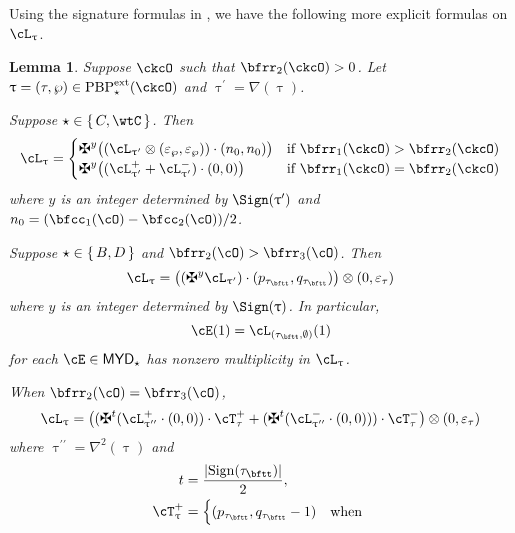 \documentclass[12pt,a4paper]{amsart}
\def\abs#1{\left|{#1}\right|}
\def\MYD{{\mathsf{MYD}}}
\def\pac#1{\ac_{#1}^+}
\def\nac#1{\ac_{#1}^-}
\def\ac{\cL}
\def\lotimes{\otimes}
\def\DD{\nabla}
\numberwithin{equation}{section}
\newtheorem{lem}[thm]{Lemma}
\theoremstyle{remark}
\def\ssign{\mathrm{Sign}}
\def\PBPes{\mathrm{PBP}^{\mathrm{ext}}_{\star}}
\def\pcT{\cT^+}
\def\ncT{\cT^-}
\def\uptaup{\uptau^{\prime}}
\def\uptaupp{\uptau^{\prime\prime}}
\begin{document}
Using the signature formulas in , we have the following more
explicit formulas on $\ac_{\uptau}$.
\begin{lem}\label{lem:dlift}
  Suppose $\ckcO$ such that $\bfrr_{2}(\ckcO)>0$. Let
  $\uptau = (\tau,\wp)\in \PBPes(\ckcO)$ and $\uptaup = \DD(\uptau)$.
\begin{enuma}
  \item
  Suppose $\star\in \set{C,\wtC}$.  Then
  \begin{equation}\label{eq:C}
    \ac_{\uptau}=
    \begin{cases}
      \maltese^{y}\big( (\ac_{\uptau'}\lotimes (\varepsilon_{\wp},\varepsilon_{\wp}))
      \cdot (n_{0},n_{0})\big) & \text{if } \bfrr_{1}(\ckcO)>\bfrr_{2}(\ckcO)\\
      \maltese^{y}\big( (\pac{\uptau'} + \nac{\uptaup})\cdot (0,0) \big)
      & \text{if } \bfrr_{1}(\ckcO)=\bfrr_{2}(\ckcO)
    \end{cases}
  \end{equation}
  where $y$ is an integer determined by $\Sign(\uptaup)$ and $n_{0} = (\bfcc_{1}(\cO)-\bfcc_{2}(\cO))/2$.
  \item
  Suppose $\star\in \set{B,D}$ and $\bfrr_{2}(\cO)>\bfrr_{3}(\cO)$. Then
  \begin{equation}\label{eq:BD}
    \ac_{\uptau}= \big((\maltese^{y}\ac_{\uptau'})\cdot (p_{\tau_{\bftt}},q_{\tau_{\bftt}})\big)
    \lotimes (0,\varepsilon_{\tau})
  \end{equation}
  where $y$ is an integer determined by $\Sign(\uptau)$.
  In particular,
  \begin{equation}\label{eq:TBD}
    \cE(1) = \ac_{(\tau_{\bftt},\emptyset)}(1)
  \end{equation}
  for each $\cE\in \MYD_\star$ has nonzero multiplicity in $\ac_{\uptau}$.
  \item
  When  $\bfrr_{2}(\cO)=\bfrr_{3}(\cO)$,
  \begin{equation}\label{eq:BD2}
    \ac_{\uptau} =
    \big((\maltese^t (\pac{\uptaupp}\cdot (0,0)) \cdot \pcT_{\tau}
    +  (\maltese^t(\nac{\uptaupp}\cdot (0,0)) ) \cdot \ncT_{\tau}\big)\lotimes(0,\varepsilon_{\tau})
  \end{equation}
  where $\uptaupp = \DD^{2}(\uptau)$ and
  \[
  \begin{split}
    t &  = \frac{\abs{\ssign(\tau_{\bftt})}}{2},\\
    \pcT_{\uptau}& = \begin{cases} (p_{\tau_{\bftt}},q_{\tau_{\bftt}}-1) & \text{when
}
\end{cases}
\end{split}\]
\end{enuma}
\end{lem}
\end{document}
